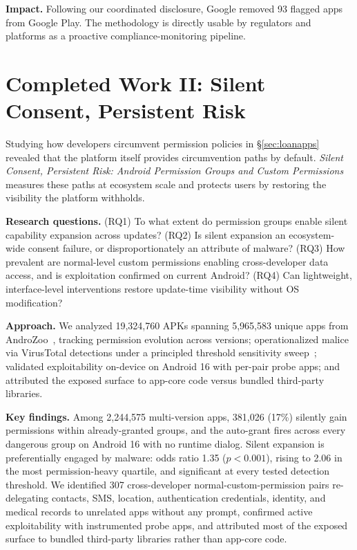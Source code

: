 \documentclass[letterpaper,11pt]{article}
\begin{document}
\textbf{Impact.} Following our coordinated disclosure, Google removed
93 flagged apps from Google Play. The methodology is directly usable
by regulators and platforms as a proactive compliance-monitoring
pipeline.

\section{Completed Work II: Silent Consent, Persistent Risk}
\label{sec:silentconsent}

Studying how developers circumvent permission policies in
\S\ref{sec:loanapps} revealed that the platform itself provides
circumvention paths by default. \emph{Silent Consent, Persistent Risk:
Android Permission Groups and Custom
Permissions}~\cite{akanji2026silent} measures these paths at ecosystem
scale and protects users by restoring the visibility the platform
withholds.

\textbf{Research questions.} (RQ1) To what extent do permission groups
enable silent capability expansion across updates? (RQ2) Is silent
expansion an ecosystem-wide consent failure, or disproportionately an
attribute of malware? (RQ3) How prevalent are normal-level custom
permissions enabling cross-developer data access, and is exploitation
confirmed on current Android? (RQ4) Can lightweight, interface-level
interventions restore update-time visibility without OS modification?

\textbf{Approach.} We analyzed 19,324,760 APKs spanning 5,965,583
unique apps from AndroZoo~\cite{allix2016androzoo}, tracking
permission evolution across versions; operationalized malice via
VirusTotal detections under a principled threshold sensitivity
sweep~\cite{zhu2020vt}; validated exploitability on-device on
Android 16 with per-pair probe apps; and attributed the exposed
surface to app-core code versus bundled third-party libraries.

\textbf{Key findings.} Among 2,244,575 multi-version apps, 381,026
(17\%) silently gain permissions within already-granted groups, and
the auto-grant fires across every dangerous group on Android 16 with
no runtime dialog. Silent expansion is preferentially engaged by
malware: odds ratio 1.35 ($p<0.001$), rising to 2.06 in the most
permission-heavy quartile, and significant at every tested detection
threshold. We identified 307 cross-developer normal-custom-permission
pairs re-delegating contacts, SMS, location, authentication
credentials, identity, and medical records to unrelated apps without
any prompt, confirmed active exploitability with instrumented probe
apps, and attributed most of the exposed surface to bundled
third-party libraries rather than app-core code.
\end{document}
